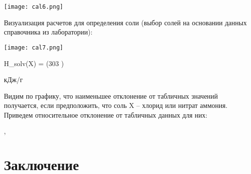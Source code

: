 \documentclass[a4paper]{article}
\begin{document}
\graphicspath{{./images/}}
		\begin{center}
		
			\texttt{[image: cal6.png]}
	

	\par
 \vspace{0.3cm}
 \end{center}
\vspace{0.3cm}
\par

\newpage
Визуализация расчетов для определения соли (выбор солей на основании данных справочника из лаборатории):

\graphicspath{{./images/}}
		\begin{center}
		
			\texttt{[image: cal7.png]}
	

	\par
 \vspace{0.3cm}
 \end{center}
\vspace{0.3cm}
\par


\begin{center}
\begin{mathmode}

\LARGE \Delta H_{solv}(X) = (303 ) \end{mathmode} \LARGE кДж/г
\end{center}
\par \vspace{0.3 cm}

Видим по графику, что наименьшее отклонение от табличных значений получается, если предположить, что соль X -- хлорид или нитрат аммония. Приведем относительное отклонение от табличных данных для них:

\begin{center}
\begin{mathmode}

\LARGE \varepsilon[NH_4Cl] , \hspace{0.3 cm} \varepsilon[NH_4NO_3] 

\end{mathmode}
\end{center}
\par \vspace{0.3 cm}



\section{\LARGE \textbf{Заключение}}
\par \vspace{0.3 cm}
\end{document}
